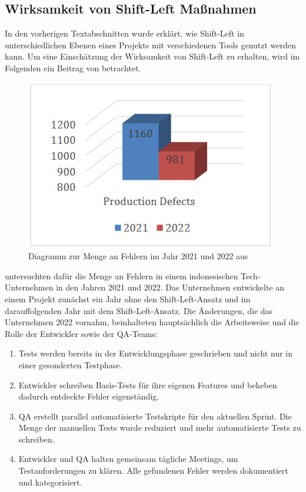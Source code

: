 \subsection{Wirksamkeit von Shift-Left Maßnahmen}

In den vorherigen Textabschnitten wurde erklärt, wie Shift-Left in unterschiedlichen Ebenen eines Projekts mit verschiedenen Tools genutzt werden kann. Um eine Einschätzung der Wirksamkeit von Shift-Left zu erhalten, wird im Folgenden ein Beitrag von \citet{andriadi_impact_2023} betrachtet.

\begin{figure}
\centering
\includegraphics[width=0.9\linewidth]{images/Impact_production_defects.png}
\caption{Diagramm zur Menge an Fehlern im Jahr 2021 und 2022 aus \cite{andriadi_impact_2023}}
\label{fig:production_defects }
\end{figure}

\citet{andriadi_impact_2023} untersuchten dafür die Menge an Fehlern in einem indonesischen Tech-Unternehmen in den Jahren 2021 und 2022. Das Unternehmen entwickelte an einem Projekt zunächst ein Jahr ohne den Shift-Left-Ansatz und im darauffolgenden Jahr mit dem Shift-Left-Ansatz. Die Änderungen, die das Unternehmen 2022 vornahm, beinhalteten hauptsächlich die Arbeitsweise und die Rolle der Entwickler sowie der QA-Teams:
\begin{enumerate}
\item Tests werden bereits in der Entwicklungsphase geschrieben und nicht nur in einer gesonderten Testphase.
\item Entwickler schreiben Basis-Tests für ihre eigenen Features und beheben dadurch entdeckte Fehler eigenständig.
\item QA erstellt parallel automatisierte Testskripte für den aktuellen Sprint. Die Menge der manuellen Tests wurde reduziert und mehr automatisierte Tests zu schreiben.
\item Entwickler und QA halten gemeinsam tägliche Meetings, um Testanforderungen zu klären. Alle gefundenen Fehler werden dokumentiert und kategorisiert.
\end{enumerate}

